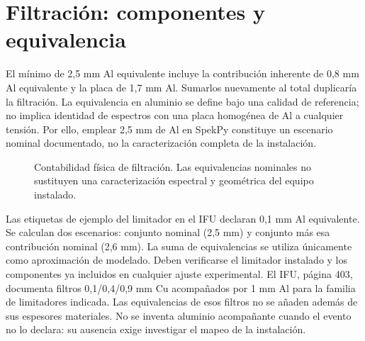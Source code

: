\section{Filtración: componentes y equivalencia}
El mínimo de 2,5 mm Al equivalente incluye la contribución inherente de 0,8 mm Al equivalente y la placa de 1,7 mm Al. Sumarlos nuevamente al total duplicaría la filtración. La equivalencia en aluminio se define bajo una calidad de referencia; no implica identidad de espectros con una placa homogénea de Al a cualquier tensión. Por ello, emplear 2,5 mm de Al en SpekPy constituye un escenario nominal documentado, no la caracterización completa de la instalación.

\begin{figure}[htbp]\centering
{}\caption{Contabilidad física de filtración. Las equivalencias nominales no sustituyen una caracterización espectral y geométrica del equipo instalado.}\end{figure}
Las etiquetas de ejemplo del limitador en el IFU declaran 0,1 mm Al equivalente. Se calculan dos escenarios: conjunto nominal (2,5 mm) y conjunto más esa contribución nominal (2,6 mm). La suma de equivalencias se utiliza únicamente como aproximación de modelado. Deben verificarse el limitador instalado y los componentes ya incluidos en cualquier ajuste experimental. El IFU, página 403, documenta filtros 0,1/0,4/0,9 mm Cu acompañados por 1 mm Al para la familia de limitadores indicada. Las equivalencias de esos filtros no se añaden además de sus espesores materiales. No se inventa aluminio acompañante cuando el evento no lo declara: su ausencia exige investigar el mapeo de la instalación.

